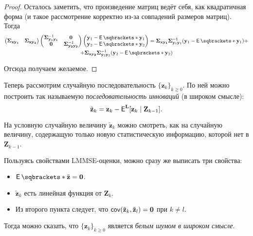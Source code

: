 \begin{proof}
	Осталось заметить, что произведение матриц ведёт себя, как квадратичная 
	форма (и такое рассмотрение корректно из-за совпадений размеров матриц). 
	Тогда
	\begin{multline*}
		\begin{pmatrix}
		\bm{\Sigma}_{\mathbf{xy_{1}}} & \bm{\Sigma}_{\mathbf{xy_{2}}}
		\end{pmatrix}
		\begin{pmatrix}
		\bm{\Sigma}_{\mathbf{y_{1}y_{1}}}^{-1} & \mathbf{0} \\
		\mathbf{0} & \bm{\Sigma}_{\mathbf{y_{2}y_{2}}}^{-1}
		\end{pmatrix}
		\begin{pmatrix}
		\mathbf{y}_{1} - \E{\mathbf{y}_{1}} \\
		\mathbf{y}_{2} - \E{\mathbf{y}_{2}}
		\end{pmatrix}
		=
		\bm{\Sigma}_{\mathbf{xy_{1}}} \bm{\Sigma}_{\mathbf{y}_{1} 
		\mathbf{y}_{1}}^{-1}(\mathbf{y}_{1} - \E{\mathbf{y}_{1}}) + \\
		+ \bm{\Sigma}_{\mathbf{xy_{2}}} \bm{\Sigma}_{\mathbf{y}_{2} 
		\mathbf{y}_{2}}^{-1}(\mathbf{y}_{2} - \E{\mathbf{y}_{2}})
	\end{multline*}
	
	Отсюда получаем желаемое.
\end{proof}

Теперь рассмотрим случайную последовательность \(\{\mathbf{z}_{k}\}_{k \geq 
0}\). По ней можно построить так называемую \emph{последовательность инноваций} 
(в широком смысле):
\[
	\tilde{\mathbf{z}}_{k} = \mathbf{z}_{k} - \E^{\mathbf{L}}[\mathbf{z}_{k} 
	\mid \mathbf{Z}_{k - 1}].
\]

На условную случайную величину \(\tilde{\mathbf{z}}_{k}\) можно смотреть, как 
на случайную величину, содержащую только новую статистическую информацию, 
которой нет в \(\mathbf{Z}_{k - 1}\). 

Пользуясь свойствами LMMSE-оценки, можно сразу же выписать три свойства:
\begin{itemize}
	\item \(\E{\tilde{\mathbf{z}}} = \mathbf{0}\).
	\item \(\tilde{\mathbf{z}}_{k}\) есть линейная функция от 
	\(\mathbf{Z}_{k}\).
	\item Из второго пункта следует, что \(\operatorname{\mathsf{cov}}(\tilde{\mathbf{z}}_{k}, 
	\tilde{\mathbf{z}}_{l}) = \mathbf{0}\) при \(k \neq l\).
\end{itemize}

Тогда можно сказать, что \(\{\mathbf{z}_{k}\}_{k \geq 0}\) является \emph{белым 
шумом в широком смысле}.

